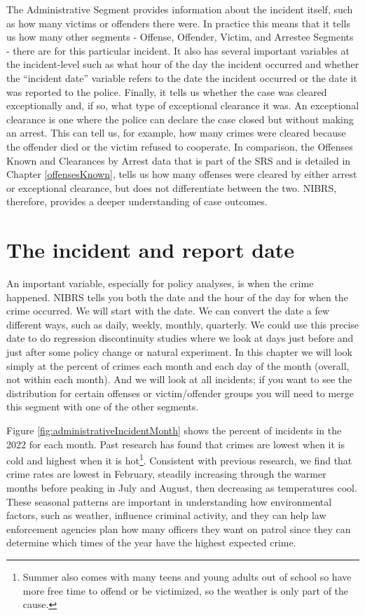 \documentclass[
]{krantz}
\begin{document}
The Administrative Segment provides information about the
incident itself, such as how many victims or offenders there
were. In practice this means that it tells us how many other
segments - Offense, Offender, Victim, and Arrestee Segments
- there are for this particular incident. It also has
several important variables at the incident-level such as
what hour of the day the incident occurred and whether the
``incident date'' variable refers to the date the incident
occurred or the date it was reported to the police. Finally,
it tells us whether the case was cleared exceptionally and,
if so, what type of exceptional clearance it was. An
exceptional clearance is one where the police can declare
the case closed but without making an arrest. This can tell
us, for example, how many crimes were cleared because the
offender died or the victim refused to cooperate. In
comparison, the Offenses Known and Clearances by Arrest data
that is part of the SRS and is detailed in Chapter
\ref{offensesKnown}, tells us how many offenses were cleared
by either arrest or exceptional clearance, but does not
differentiate between the two. NIBRS, therefore, provides a
deeper understanding of case outcomes.

\section{The incident and report
date}\label{the-incident-and-report-date}

An important variable, especially for policy analyses, is
when the crime happened. NIBRS tells you both the date and
the hour of the day for when the crime occurred. We will
start with the date. We can convert the date a few different
ways, such as daily, weekly, monthly, quarterly. We could
use this precise date to do regression discontinuity studies
where we look at days just before and just after some policy
change or natural experiment. In this chapter we will look
simply at the percent of crimes each month and each day of
the month (overall, not within each month). And we will look
at all incidents; if you want to see the distribution for
certain offenses or victim/offender groups you will need to
merge this segment with one of the other segments.

Figure \ref{fig:administrativeIncidentMonth} shows the
percent of incidents in the 2022 for each month. Past
research has found that crimes are lowest when it is cold
and highest when it is hot\footnote{Summer also comes with
  many teens and young adults out of school so have more
  free time to offend or be victimized, so the weather is
  only part of the cause.}. Consistent with previous
research, we find that crime rates are lowest in February,
steadily increasing through the warmer months before peaking
in July and August, then decreasing as temperatures cool.
These seasonal patterns are important in understanding how
environmental factors, such as weather, influence criminal
activity, and they can help law enforcement agencies plan
how many officers they want on patrol since they can
determine which times of the year have the highest expected
crime.
\end{document}
